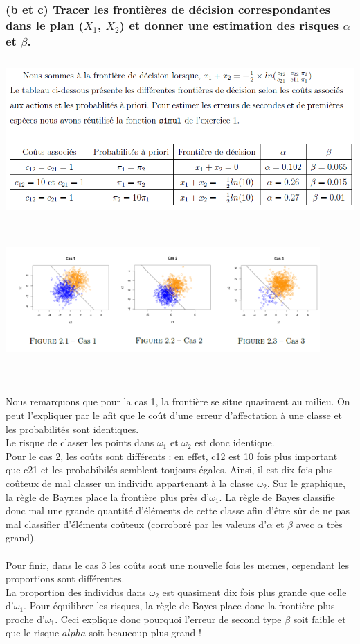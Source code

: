 \documentclass[a4paper, 8pt]{article}
\begin{document}
\subsubsection*{(b et c) Tracer les frontières de décision correspondantes dans le plan (\textit{$X_{1}$}, \textit{$X_{2}$}) et donner une estimation des risques $\alpha$ et $\beta$.}
\includegraphics[height = 6cm, width = 14cm]{plots/f6.png}\\
\includegraphics[height = 6cm, width = 12cm]{plots/plot_simul_6.png}\\ \\

Nous remarquons que pour la cas 1, la frontière se situe quasiment au milieu. On peut l'expliquer par le afit que le coût d'une erreur d'affectation à une classe et les probabilités sont identiques.\\
Le risque de classer les points dans $\omega_{1}$ et $\omega_{2}$  est donc identique.\\
Pour le cas 2, les coûts sont différents : en effet, c12 est 10 fois plus important que c21 et les probabibilés semblent toujours égales. Ainsi, il est dix fois plus coûteux de mal classer un individu appartenant à la classe $\omega_{2}$. Sur le graphique, la règle de Baynes place la frontière plus près d'$\omega_{1}$. La règle de Bayes classifie donc mal une grande quantité d'éléments de cette classe afin d'être sûr de ne pas mal classifier d'éléments coûteux (corroboré par les valeurs d'$\alpha$ et $\beta$ avec $\alpha$ très grand).\\ \\
Pour finir, dans le cas 3 les coûts sont une nouvelle fois les memes, cependant les proportions sont différentes.\\
La proportion des individus dans $\omega_{2}$ est quasiment dix fois plus grande que celle d'$\omega_{1}$. Pour équilibrer les risques, la règle de Bayes place donc la frontière plus proche d'$\omega_{1}$. Ceci explique donc pourquoi l'erreur de second type $\beta$  soit faible et que le risque $alpha$ soit beaucoup plus grand !
\end{document}
